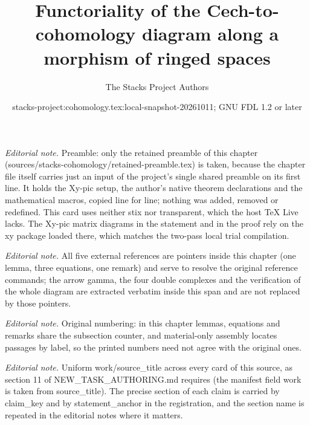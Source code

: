 \documentclass[10pt,a4paper]{amsart}
\title{Functoriality of the Cech-to-cohomology diagram along a morphism of ringed spaces}
\author{The Stacks Project Authors}
\date{stacks-project:cohomology.tex:local-snapshot-20261011; GNU FDL 1.2 or later}
\theoremstyle{plain}
\theoremstyle{definition}
\theoremstyle{remark}
\numberwithin{equation}{subsection}
\begin{document}
\maketitle
\noindent\textit{Editorial note.} Preamble: only the retained preamble of this chapter (sources/stacks-cohomology/retained-preamble.tex) is taken, because the chapter file itself carries just an input of the project's single shared preamble on its first line. It holds the Xy-pic setup, the author's native theorem declarations and the mathematical macros, copied line for line; nothing was added, removed or redefined. This card uses neither stix nor transparent, which the host TeX Live lacks. The Xy-pic matrix diagrams in the statement and in the proof rely on the xy package loaded there, which matches the two-pass local trial compilation.\par\medskip
\noindent\textit{Editorial note.} All five external references are pointers inside this chapter (one lemma, three equations, one remark) and serve to resolve the original reference commands; the arrow gamma, the four double complexes and the verification of the whole diagram are extracted verbatim inside this span and are not replaced by those pointers.\par\medskip
\noindent\textit{Editorial note.} Original numbering: in this chapter lemmas, equations and remarks share the subsection counter, and material-only assembly locates passages by label, so the printed numbers need not agree with the original ones.\par\medskip
\noindent\textit{Editorial note.} Uniform work/source\_title across every card of this source, as section 11 of NEW\_TASK\_AUTHORING.md requires (the manifest field work is taken from source\_title). The precise section of each claim is carried by claim\_key and by statement\_anchor in the registration, and the section name is repeated in the editorial notes where it matters.\par\medskip
\end{document}
